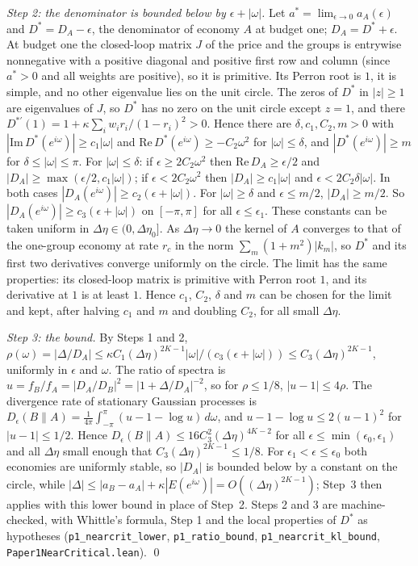 \documentclass[12pt]{article}
\theoremstyle{definition}
\theoremstyle{remark}
\begin{document}
\emph{Step 2: the denominator is bounded below by $\epsilon+|\omega|$.} Let $a^*=\lim_{\epsilon\to0}a_A(\epsilon)$ and $D^*=D_A-\epsilon$, the denominator of economy $A$ at budget one; $D_A=D^*+\epsilon$. At budget one the closed-loop matrix $J$ of the price and the groups is entrywise nonnegative with a positive diagonal and positive first row and column (since $a^*>0$ and all weights are positive), so it is primitive. Its Perron root is $1$, it is simple, and no other eigenvalue lies on the unit circle. The zeros of $D^*$ in $|z|\ge1$ are eigenvalues of $J$, so $D^*$ has no zero on the unit circle except $z=1$, and there $D^{*\prime}(1)=1+\kappa\sum_iw_ir_i/(1-r_i)^2>0$. Hence there are $\delta,c_1,C_2,m>0$ with $|\mathrm{Im}\,D^*(e^{i\omega})|\ge c_1|\omega|$ and $\mathrm{Re}\,D^*(e^{i\omega})\ge-C_2\omega^2$ for $|\omega|\le\delta$, and $|D^*(e^{i\omega})|\ge m$ for $\delta\le|\omega|\le\pi$. For $|\omega|\le\delta$: if $\epsilon\ge2C_2\omega^2$ then $\mathrm{Re}\,D_A\ge\epsilon/2$ and $|D_A|\ge\max(\epsilon/2,c_1|\omega|)$; if $\epsilon<2C_2\omega^2$ then $|D_A|\ge c_1|\omega|$ and $\epsilon<2C_2\delta|\omega|$. In both cases $|D_A(e^{i\omega})|\ge c_2(\epsilon+|\omega|)$. For $|\omega|\ge\delta$ and $\epsilon\le m/2$, $|D_A|\ge m/2$. So $|D_A(e^{i\omega})|\ge c_3(\epsilon+|\omega|)$ on $[-\pi,\pi]$ for all $\epsilon\le\epsilon_1$. These constants can be taken uniform in $\Delta\eta\in(0,\Delta\eta_0]$. As $\Delta\eta\to0$ the kernel of $A$ converges to that of the one-group economy at rate $r_c$ in the norm $\sum_m(1+m^2)|k_m|$, so $D^*$ and its first two derivatives converge uniformly on the circle. The limit has the same properties: its closed-loop matrix is primitive with Perron root $1$, and its derivative at $1$ is at least $1$. Hence $c_1$, $C_2$, $\delta$ and $m$ can be chosen for the limit and kept, after halving $c_1$ and $m$ and doubling $C_2$, for all small $\Delta\eta$.

\emph{Step 3: the bound.} By Steps 1 and 2, $\rho(\omega)=|\Delta/D_A|\le\kappa C_1(\Delta\eta)^{2K-1}|\omega|/(c_3(\epsilon+|\omega|))\le C_3(\Delta\eta)^{2K-1}$, uniformly in $\epsilon$ and $\omega$. The ratio of spectra is $u=f_B/f_A=|D_A/D_B|^2=|1+\Delta/D_A|^{-2}$, so for $\rho\le1/8$, $|u-1|\le4\rho$. The divergence rate of stationary Gaussian processes is $D_\epsilon(B\|A)=\frac1{4\pi}\int_{-\pi}^{\pi}(u-1-\log u)\,d\omega$, and $u-1-\log u\le2(u-1)^2$ for $|u-1|\le1/2$. Hence $D_\epsilon(B\|A)\le16C_3^2(\Delta\eta)^{4K-2}$ for all $\epsilon\le\min(\epsilon_0,\epsilon_1)$ and all $\Delta\eta$ small enough that $C_3(\Delta\eta)^{2K-1}\le1/8$. For $\epsilon_1<\epsilon\le\epsilon_0$ both economies are uniformly stable, so $|D_A|$ is bounded below by a constant on the circle, while $|\Delta|\le|a_B-a_A|+\kappa|E(e^{i\omega})|=O((\Delta\eta)^{2K-1})$; Step~3 then applies with this lower bound in place of Step~2. Steps 2 and 3 are machine-checked, with Whittle's formula, Step 1 and the local properties of $D^*$ as hypotheses (\texttt{p1\_nearcrit\_lower}, \texttt{p1\_ratio\_bound}, \texttt{p1\_nearcrit\_kl\_bound}, \nolinkurl{Paper1NearCritical.lean}). \qed
\end{document}
